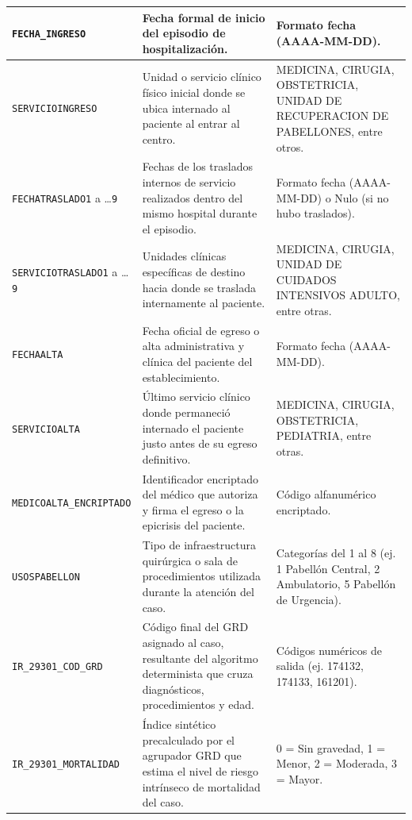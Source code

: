 \begin{table}[htbp]
\begin{tabular}{|l|l|l|}
\parbox[t]{3.8cm}{\texttt{FECHA\_INGRESO}} & \parbox[t]{5.4cm}{Fecha formal de inicio del episodio de hospitalización.} & \parbox[t]{3.8cm}{Formato fecha (AAAA-MM-DD).} \\ \hline
\parbox[t]{3.8cm}{\texttt{SERVICIOINGRESO}} & \parbox[t]{5.4cm}{Unidad o servicio clínico físico inicial donde se ubica internado al paciente al entrar al centro.} & \parbox[t]{3.8cm}{MEDICINA, CIRUGIA, OBSTETRICIA, UNIDAD DE RECUPERACION DE PABELLONES, entre otros.} \\ \hline
\parbox[t]{3.8cm}{\texttt{FECHATRASLADO1} a \dots\texttt{9}} & \parbox[t]{5.4cm}{Fechas de los traslados internos de servicio realizados dentro del mismo hospital durante el episodio.} & \parbox[t]{3.8cm}{Formato fecha (AAAA-MM-DD) o Nulo (si no hubo traslados).} \\ \hline
\parbox[t]{3.8cm}{\texttt{SERVICIOTRASLADO1} a \dots\texttt{9}} & \parbox[t]{5.4cm}{Unidades clínicas específicas de destino hacia donde se traslada internamente al paciente.} & \parbox[t]{3.8cm}{MEDICINA, CIRUGIA, UNIDAD DE CUIDADOS INTENSIVOS ADULTO, entre otras.} \\ \hline
\parbox[t]{3.8cm}{\texttt{FECHAALTA}} & \parbox[t]{5.4cm}{Fecha oficial de egreso o alta administrativa y clínica del paciente del establecimiento.} & \parbox[t]{3.8cm}{Formato fecha (AAAA-MM-DD).} \\ \hline
\parbox[t]{3.8cm}{\texttt{SERVICIOALTA}} & \parbox[t]{5.4cm}{Último servicio clínico donde permaneció internado el paciente justo antes de su egreso definitivo.} & \parbox[t]{3.8cm}{MEDICINA, CIRUGIA, OBSTETRICIA, PEDIATRIA, entre otras.} \\ \hline
\parbox[t]{3.8cm}{\texttt{MEDICOALTA\_ENCRIPTADO}} & \parbox[t]{5.4cm}{Identificador encriptado del médico que autoriza y firma el egreso o la epicrisis del paciente.} & \parbox[t]{3.8cm}{Código alfanumérico encriptado.} \\ \hline
\parbox[t]{3.8cm}{\texttt{USOSPABELLON}} & \parbox[t]{5.4cm}{Tipo de infraestructura quirúrgica o sala de procedimientos utilizada durante la atención del caso.} & \parbox[t]{3.8cm}{Categorías del 1 al 8 (ej. 1 Pabellón Central, 2 Ambulatorio, 5 Pabellón de Urgencia).} \\ \hline
\parbox[t]{3.8cm}{\texttt{IR\_29301\_COD\_GRD}} & \parbox[t]{5.4cm}{Código final del GRD asignado al caso, resultante del algoritmo determinista que cruza diagnósticos, procedimientos y edad.} & \parbox[t]{3.8cm}{Códigos numéricos de salida (ej. 174132, 174133, 161201).} \\ \hline
\parbox[t]{3.8cm}{\texttt{IR\_29301\_MORTALIDAD}} & \parbox[t]{5.4cm}{Índice sintético precalculado por el agrupador GRD que estima el nivel de riesgo intrínseco de mortalidad del caso.} & \parbox[t]{3.8cm}{0 = Sin gravedad, 1 = Menor, 2 = Moderada, 3 = Mayor.} \\ \hline
\end{tabular}
\end{table}

